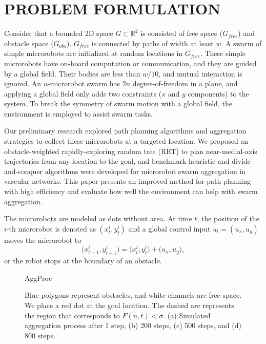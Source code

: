 \section{PROBLEM FORMULATION}\label{ProbForm}

Consider that a bounded 2D space $G \subset \mathbb{R}^2$ is consisted of free space ($G_{free}$) and obstacle space ($G_{obs}$). $G_{free}$ is connected by paths of width at least $w$. A swarm of simple microrobots are initialized at random locations in $G_{free}$. These simple microrobots have on-board computation or communication, and they are guided by a global field. Their bodies are less than $w/10$, and mutual interaction is ignored. An $n$-microrobot swarm has $2n$ degree-of-freedom in a plane, and applying a global field only adds two constraints ($x$ and $y$ components) to the system. To break the symmetry of swarm motion with a global field, the environment is employed to assist swarm tasks. 

Our preliminary research explored path planning algorithms and aggregation strategies to collect these microrobots at a targeted location. We proposed an obstacle-weighted rapidly-exploring random tree (RRT) to plan near-medial-axis trajectories from any location to the goal, and benchmark heuristic and divide-and-conquer algorithms were developed for microrobot swarm aggregation in vascular networks. This paper presents an improved method for path planning with high efficiency and evaluate how well the environment can help with swarm aggregation. 

The microrobots are modeled as dots without area. At time $t$, the position of the $i$-th microrobot is denoted as $(x_t^i, y_t^i)$ and a global control input $u_t=(u_x, u_y)$ moves the microrobot to
\begin{equation}
\big(x_{t+1}^i, y_{t+1}^i\big) = \big(x_t^i, y_t^i\big)+\big(u_x,u_y\big), 
\end{equation}   
or the robot stops at the boundary of an obstacle.
\begin{figure}[h]
	\centering
	\begin{overpic}[width=1\columnwidth]{AggProc}
	\end{overpic}
	
	\caption{\label{fig:AggProc} Blue polygons represent obstacles, and white channels are free space. We place a red dot at the goal location. The dashed arc represents the region that corresponds to $F(n,t)<\sigma$. (a) Simulated aggregation process after 1 step, (b) 200 steps, (c) 500 steps, and (d) 800 steps.} 
\end{figure}



